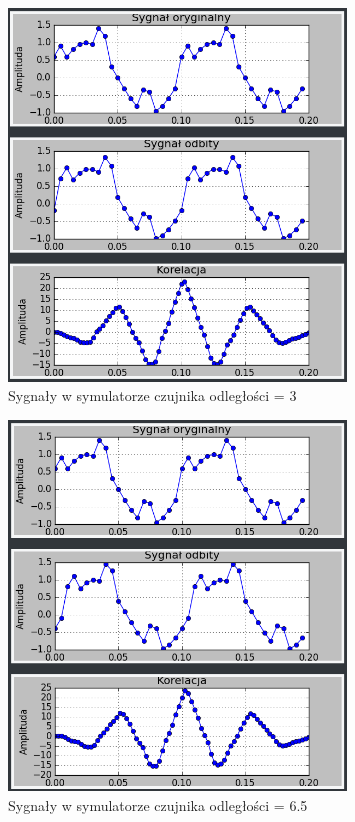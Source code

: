 \documentclass{article}
\begin{document}
{{\begin{figure}[h!]
                \includegraphics[width=0.8\textwidth]{img/sim6.png}
                \caption{Sygnały w symulatorze czujnika odległości = 3}
            \end{figure}
            \begin{figure}[h!]
                \centering
                \includegraphics[width=0.8\textwidth]{img/sim7.png}
                \caption{Sygnały w symulatorze czujnika odległości = 6.5}

\end{figure}}}
\end{document}
